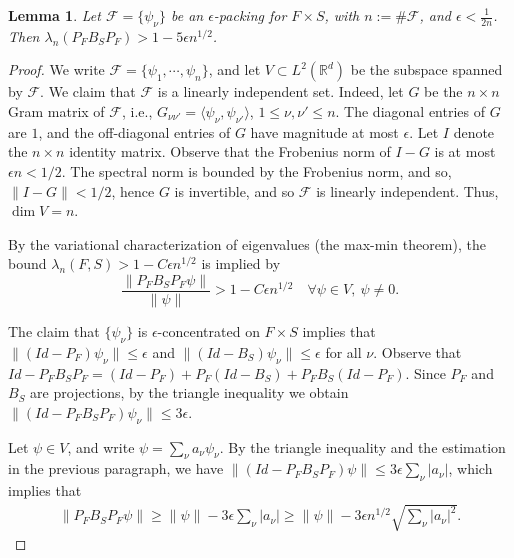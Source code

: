 \documentclass[conference]{IEEEtran}
\def\R{\mathbb{R}}
\newtheorem{lemma}[theorem]{Lemma}
\numberwithin{equation}{section}
\newcommand{\cF}{\mathcal F}
\def\R{\mathbb{R}}
\begin{document}
\begin{lemma}\label{packing_spectral:lem}
Let $\cF = \{\psi_\nu\}$ be an $\epsilon$-packing  for $F \times S$, with $n := \#\cF$, and $\epsilon < \frac{1}{2n}$. Then $\lambda_{n}(P_F B_S P_F) > 1 - 5 \epsilon n^{1/2}$.
\end{lemma}
\begin{proof}
We write $\cF = \{\psi_1,\cdots,\psi_n\}$, and let $V \subset L^2(\R^d)$ be the subspace spanned by $\cF$. We claim that $\cF$ is a linearly independent set. Indeed, let $G$ be the $n \times n$ Gram matrix of $\cF$, i.e., $G_{\nu \nu'} = \langle \psi_\nu,\psi_{\nu'}\rangle$, $1 \leq \nu,\nu' \leq n$. The diagonal entries of $G$ are $1$, and the off-diagonal entries of $G$ have magnitude at most $\epsilon$. Let $I$ denote the $n \times n$ identity matrix. Observe that the Frobenius norm of $I - G$ is at most $\epsilon n < 1/2$. The spectral norm is bounded by the Frobenius norm, and so, $\| I - G \| < 1/2$, hence $G$ is invertible, and so $\cF$ is linearly independent. Thus, $\dim V = n$. 

By the variational characterization of eigenvalues (the max-min theorem), the bound $\lambda_n(F,S) > 1 - C \epsilon n^{1/2}$ is implied by
\[
\frac{\|P_F B_S P_F \psi\|}{\| \psi \|} > 1- C \epsilon n^{1/2} \quad \forall \psi \in V,  ~ \psi \neq 0.
\]

The claim that $\{\psi_\nu\}$ is $\epsilon$-concentrated on $F \times S$ implies that $\|(Id - P_F) \psi_\nu \| \leq \epsilon$ and $\|(Id - B_S) \psi_\nu \| \leq \epsilon$ for all $\nu$. Observe that $Id - P_F B_S P_F = (Id - P_F) + P_F(Id - B_S) + P_F B_S (Id - P_F)$. Since $P_F$ and $B_S$ are projections, by the triangle inequality we obtain $\|(Id - P_F B_S P_F) \psi_\nu \| \leq 3 \epsilon$.

Let $\psi \in V$, and write $\psi = \sum_\nu a_\nu \psi_\nu$. By the triangle inequality and the estimation in the previous paragraph, we have $\| (Id - P_FB_SP_F) \psi \| \leq 3 \epsilon \sum_{\nu} |a_\nu|$, which implies that
\begin{align*}
\| P_F B_S P_F \psi \| \geq \| \psi \| - 3 \epsilon \sum_\nu |a_\nu| \geq \| \psi\| - 3 \epsilon n^{1/2} 
 \sqrt{\sum_\nu |a_\nu|^2}.
\end{align*}
 

\end{proof}
\end{document}
